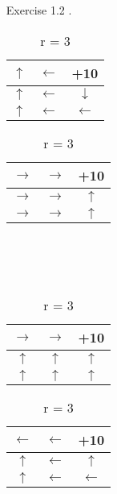 \documentclass[letterpaper, 12pt]{article}
\begin{document}
\begin{enumerate}
    \item[Exercise 1.2].
    \begin{table}[H]
        \caption{Policy for different reward values}
        \begin{subtable}{.5\linewidth}
          \centering
            \begin{tabular}{|c|c|c|} \hline
                \cellcolor[HTML]{F8CECC}$\uparrow$ & $\leftarrow$ & \cellcolor[HTML]{A5F19E}+10 \\ \hline
                $\uparrow$ & $\leftarrow$ & $\downarrow$ \\ \hline
                $\uparrow$ & $\leftarrow$ & $\leftarrow$ \\ \hline
            \end{tabular}
            \caption{r = 100}
        \end{subtable}
        \begin{subtable}{.5\linewidth}
          \centering
            \begin{tabular}{|c|c|c|} \hline
                \cellcolor[HTML]{F8CECC}$\rightarrow$ & $\rightarrow$ & \cellcolor[HTML]{A5F19E}+10 \\ \hline
                $\rightarrow$ & $\rightarrow$ & $\uparrow$ \\ \hline
                $\rightarrow$ & $\rightarrow$ & $\uparrow$ \\ \hline
            \end{tabular}
            \caption{r = -3}
        \end{subtable} 
        \\ \\ \\
        \begin{subtable}{.5\linewidth}
            \centering
              \begin{tabular}{|c|c|c|} \hline
                \cellcolor[HTML]{F8CECC}$\rightarrow$ & $\rightarrow$ & \cellcolor[HTML]{A5F19E}+10 \\ \hline
                $\uparrow$ & $\uparrow$ & $\uparrow$ \\ \hline
                $\uparrow$ & $\uparrow$ & $\uparrow$ \\ \hline
              \end{tabular}
              \caption{r = 0}
          \end{subtable} 
          \begin{subtable}{.5\linewidth}
            \centering
              \begin{tabular}{|c|c|c|} \hline
                \cellcolor[HTML]{F8CECC}$\leftarrow$ & $\leftarrow$ & \cellcolor[HTML]{A5F19E}+10 \\ \hline
                $\uparrow$ & $\leftarrow$ & $\uparrow$ \\ \hline
                $\uparrow$ & $\leftarrow$ & $\leftarrow$ \\ \hline
              \end{tabular}
              \caption{r = 3}
          \end{subtable} 
    \end{table}


\end{enumerate}
\end{document}
